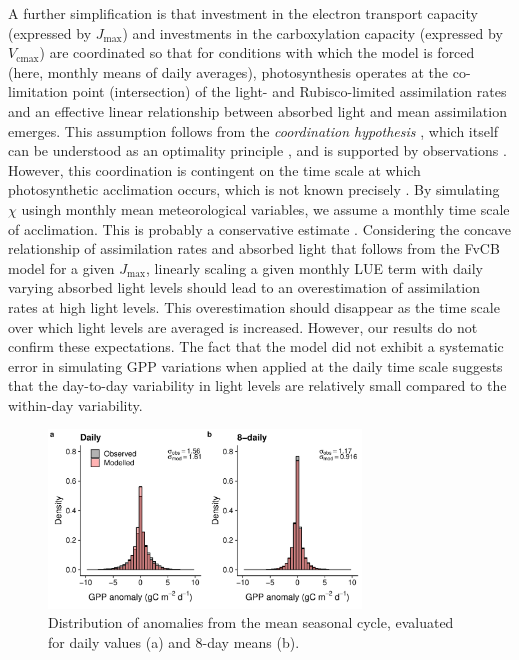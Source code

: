 \documentclass[gmd, manuscript]{copernicus}
\newcommand{\vcmax}{$V_{\text{cmax}}$}
\newcommand{\jmax}{$J_{\text{max}}$}
\begin{document}
A further simplification is that investment in the electron transport capacity (expressed by \jmax ) and investments in the carboxylation capacity (expressed by \vcmax ) are coordinated so that for conditions with which the model is forced (here, monthly means of daily averages), photosynthesis operates at the co-limitation point (intersection) of the light- and Rubisco-limited assimilation rates and an effective linear relationship between absorbed light and mean assimilation emerges. This assumption follows from the \textit{coordination hypothesis} \citep{chen93, haxeltine96}, which itself can be understood as an optimality principle \citep{haxeltine96}, and is supported by observations \citep{maire12po}. However, this coordination is contingent on the time scale at which photosynthetic acclimation occurs, which is not known precisely  \citep{smithdukes13gcb, way14}. By simulating $\chi$ usingh monthly mean meteorological variables, we assume a monthly time scale of acclimation. This is probably a conservative estimate \citep{smithdukes17, veres84}. Considering the concave relationship of assimilation rates and absorbed light that follows from the FvCB model for a given \jmax , linearly scaling a given monthly LUE term with daily varying absorbed light levels should lead to an overestimation of assimilation rates at high light levels. This overestimation should disappear as the time scale over which light levels are averaged is increased. However, our results do not confirm these expectations. The fact that the model did not exhibit a systematic error in simulating GPP variations when applied at the daily time scale suggests that the day-to-day variability in light levels are relatively small compared to the within-day variability.

\begin{figure}[t]
    \centering
\includegraphics[width=8.3cm]{fig/hist_anomalies.pdf}
    \caption{Distribution of anomalies from the mean seasonal cycle, evaluated for daily values (a) and 8-day means (b).} 
    \label{fig:modobs_anomalies}
\end{figure}
\end{document}
